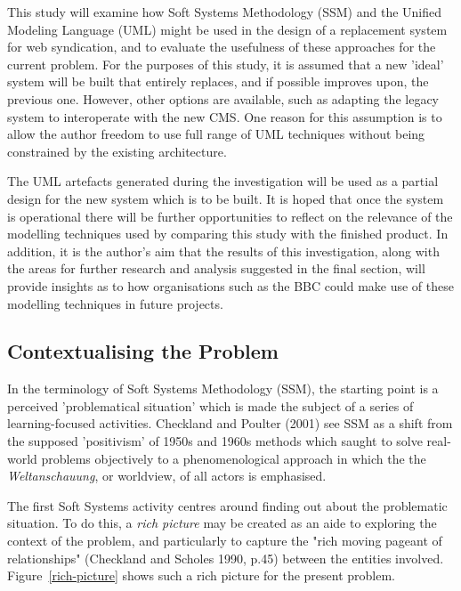 \documentclass{article}
\begin{document}
This study will examine how Soft Systems Methodology (SSM) and the Unified Modeling Language (UML) might be used in the design of a replacement system for web syndication, and to evaluate the usefulness of these approaches for the current problem. For the purposes of this study, it is assumed that a new 'ideal' system will be built that entirely replaces, and if possible improves upon, the previous one. However, other options are available, such as adapting the legacy system to interoperate with the new CMS. One reason for this assumption is to allow the author freedom to use full range of UML techniques without being constrained by the existing architecture.

The UML artefacts generated during the investigation will be used as a partial design for the new system which is to be built. It is hoped that once the system is operational there will be further opportunities to reflect on the relevance of the modelling techniques used by comparing this study with the finished product. In addition, it is the author's aim that the results of this investigation, along with the areas for further research and analysis suggested in the final section, will provide insights as to how organisations such as the BBC could make use of these modelling techniques in future projects.

\subsection{Contextualising the Problem}

In the terminology of Soft Systems Methodology (SSM), the starting point is a perceived 'problematical situation' which is made the subject of a series of learning-focused activities. Checkland and Poulter (2001) see SSM as a shift from the supposed 'positivism' of 1950s and 1960s methods which saught to solve real-world problems objectively to a phenomenological approach in which the the \textit{Weltanschauung}, or worldview, of all actors is emphasised.

The first Soft Systems activity centres around finding out about the problematic situation. To do this, a \textit{rich picture} may be created as an aide to exploring the context of the problem, and particularly to capture the "rich moving pageant of relationships" (Checkland and Scholes 1990, p.45) between the entities involved. Figure~\ref{rich-picture} shows such a rich picture for the present problem. 
\end{document}
